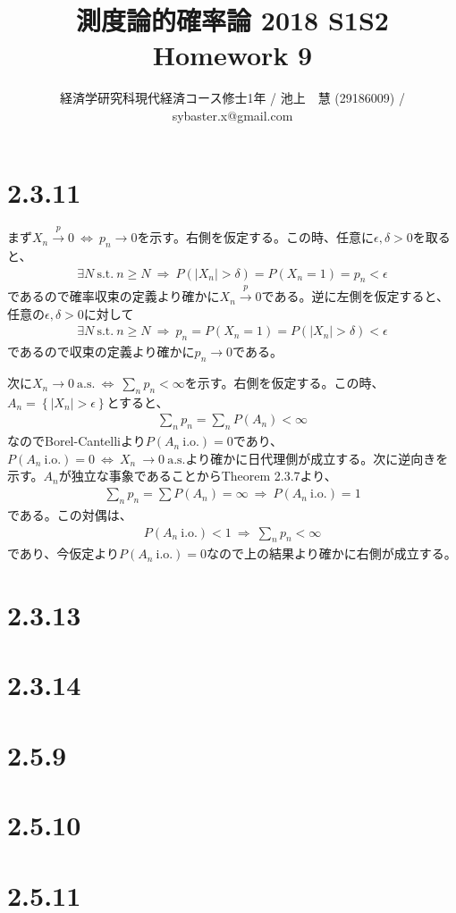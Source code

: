 \documentclass{article}
\begin{document}
\title{測度論的確率論 2018 S1S2 \\ 
Homework 9}
\author{経済学研究科現代経済コース修士1年 / 池上　慧 (29186009) / sybaster.x@gmail.com}
\maketitle

\section{2.3.11}
まず$X_n \xrightarrow{p} 0\ \Leftrightarrow\ p_n \to 0$を示す。右側を仮定する。この時、任意に$\epsilon, \delta > 0$を取ると、
\begin{align*}
	\exists N\ \text{s.t.}\ n\geq N\ \Rightarrow\ P\left( |X_n| > \delta \right) = P(X_n = 1) = p_n < \epsilon
\end{align*}
であるので確率収束の定義より確かに$X_n \xrightarrow{p} 0$である。逆に左側を仮定すると、任意の$\epsilon, \delta > 0$に対して
\begin{align*}
	\exists N\ \text{s.t.}\ n\geq N\ \Rightarrow\ p_n = P(X_n = 1) = P(|X_n| > \delta) < \epsilon
\end{align*}
であるので収束の定義より確かに$p_n \to 0$である。

次に$X_n \to 0\ \text{a.s.}\ \Leftrightarrow\ \sum_n p_n < \infty$を示す。右側を仮定する。この時、$A_n = \left\{ |X_n| > \epsilon \right\}$とすると、
\begin{align*}
	\sum_n p_n = \sum_n P(A_n) < \infty
\end{align*}
なのでBorel-Cantelliより$P(A_n\ \text{i.o.}) = 0$であり、$P(A_n\ \text{i.o.}) = 0\ \Leftrightarrow\ X_n\ \to 0 \ \text{a.s.}$より確かに日代理側が成立する。次に逆向きを示す。$A_n$が独立な事象であることからTheorem 2.3.7より、
\begin{align*}
	\sum_n p_n = \sum P(A_n) = \infty\ \Rightarrow\ P(A_n\ \text{i.o.}) = 1
\end{align*}
である。この対偶は、
\begin{align*}
	P(A_n\ \text{i.o.}) < 1\ \Rightarrow\ \sum_n p_n < \infty
\end{align*}
であり、今仮定より$P(A_n\ \text{i.o.}) = 0$なので上の結果より確かに右側が成立する。

\section{2.3.13}

\section{2.3.14}

\section{2.5.9}

\section{2.5.10}

\section{2.5.11}
\end{document}
